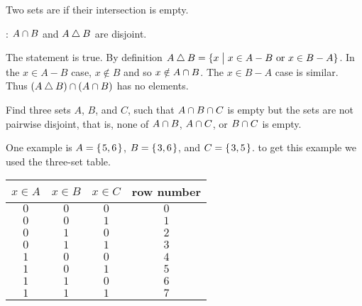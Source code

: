 \documentclass{test}  %
\begin{document}
\begin{problem}
\end{problem}

\begin{df}
Two sets are  if their intersection is empty.  
\end{df}

\begin{problem}
\begin{exes}
\begin{exercise} 
  \pord: $A\cap B$ and $A\mathbin{\triangle} B$ are disjoint.  
\end{exercise}
\begin{answer}
  The statement is true.
  By definition $A\mathbin{\triangle} B=\{x \bigm| \text{$x\in A-B$ or $x\in B-A$}\}$.
  In the $x\in A-B$ case, $x\notin B$ and so $x\notin A\cap B$.
  The $x\in B-A$ case is similar.
  Thus $(A\mathbin{\triangle} B)\cap (A\cap B)$ has no elements.  
\end{answer}
\begin{exercise}
  Find three sets $A$, $B$, and $C$, such that 
  $A\cap B\cap C$ is empty but the sets are
  not pairwise disjoint, that is, none of $A\cap B$, 
  $A\cap C$, or $B\cap C$ is empty. 
\end{exercise}
\begin{answer}
  One example is $A=\mbox{$\{\hspace{0.1em}5,6\hspace{0.1em}\}$}$, $B=\mbox{$\{\hspace{0.1em}3,6\hspace{0.1em}\}$}$, and 
  $C=\mbox{$\{\hspace{0.1em}3,5\hspace{0.1em}\}$}$.
  \remark
  to get this example we used the three-set table.
  \begin{center} \small
    \begin{tabular}{ccc|c}
      $x\in A$  &$x\in B$  &$x\in C$  &row number \\ \hline
         $0$    &$0$       &$0$       &$0$    \\
         $0$    &$0$       &$1$       &$1$    \\
         $0$    &$1$       &$0$       &$2$    \\
         $0$    &$1$       &$1$       &$3$    \\[.5ex]
         $1$    &$0$       &$0$       &$4$    \\
         $1$    &$0$       &$1$       &$5$    \\
         $1$    &$1$       &$0$       &$6$    \\
         $1$    &$1$       &$1$       &$7$    

\end{tabular}
\end{center}
\end{answer}
\end{exes}
\end{problem}
\end{document}
